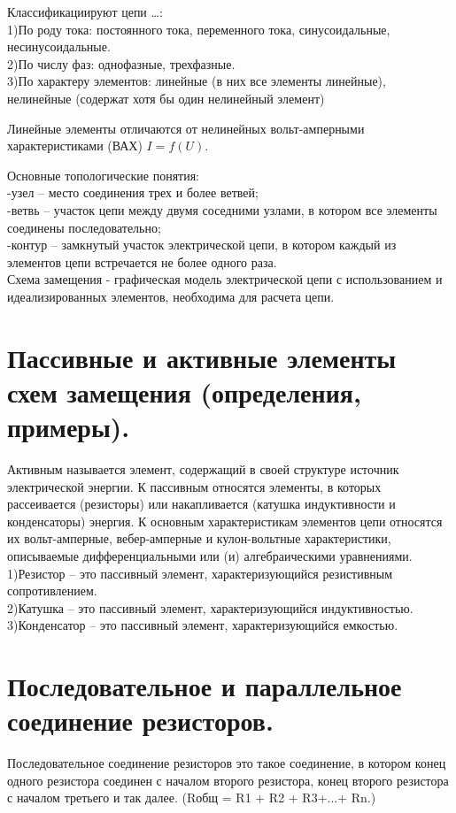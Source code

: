 \documentclass[a4paper, 12pt]{article}
\begin{document}
Классификациируют цепи \dots:\\
1)По роду тока: постоянного тока, переменного тока, синусоидальные, несинусоидальные.\\
2)По числу фаз: однофазные, трехфазные.\\
3)По характеру элементов: линейные (в них все элементы линейные), нелинейные (содержат хотя бы один нелинейный элемент)

Линейные элементы отличаются от нелинейных вольт-амперными характеристиками (ВАХ) $ I = f(U) $.

Основные топологические понятия:\\
-узел – место соединения трех и более ветвей;\\
-ветвь – участок цепи между двумя соседними узлами, в котором  все  элементы соединены последовательно;\\
-контур – замкнутый участок электрической цепи, в котором каждый из элементов цепи встречается не более одного раза.\\

Схема замещения - графическая модель электрической цепи с использованием и идеализированных элементов, необходима для расчета цепи.
\section{Пассивные и активные элементы схем замещения (определения, примеры).}
Активным называется элемент, содержащий в своей структуре источник электрической энергии. К пассивным относятся элементы, в которых рассеивается (резисторы) или накапливается (катушка индуктивности и конденсаторы) энергия. К основным характеристикам элементов цепи относятся их вольт-амперные, вебер-амперные и кулон-вольтные характеристики, описываемые дифференциальными или (и) алгебраическими уравнениями.\\
1)Резистор – это пассивный элемент, характеризующийся резистивным сопротивлением.\\
2)Катушка – это пассивный элемент, характеризующийся индуктивностью.\\
3)Конденсатор – это пассивный элемент, характеризующийся емкостью.
\section{Последовательное и параллельное соединение резисторов.}
Последовательное соединение резисторов это такое соединение, в котором конец одного резистора соединен с началом второго резистора, конец второго резистора с началом третьего и так далее. (Rобщ = R1 + R2 + R3+...+ Rn.)
\end{document}
